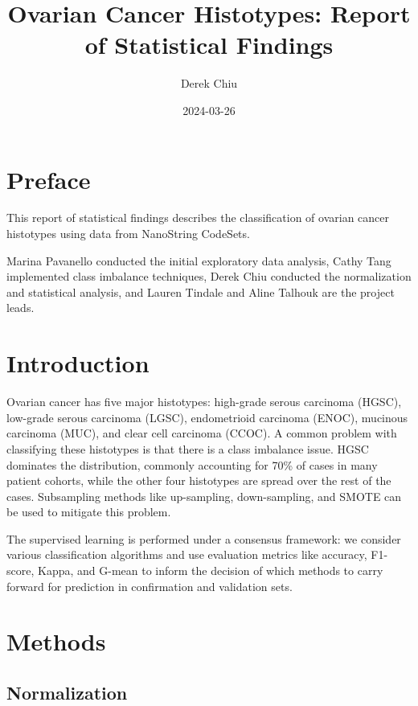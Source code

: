 \documentclass[
]{report}
\title{Ovarian Cancer Histotypes: Report of Statistical Findings}
\author{Derek Chiu}
\date{2024-03-26}
\begin{document}
\maketitle

{
\hypersetup{linkcolor=}
\setcounter{tocdepth}{1}
\tableofcontents
}
\listoffigures
\listoftables
\hypertarget{preface}{%
\chapter*{Preface}\label{preface}}

This report of statistical findings describes the classification of ovarian cancer histotypes using data from NanoString CodeSets.

Marina Pavanello conducted the initial exploratory data analysis, Cathy Tang implemented class imbalance techniques, Derek Chiu conducted the normalization and statistical analysis, and Lauren Tindale and Aline Talhouk are the project leads.

\hypertarget{introduction}{%
\chapter{Introduction}\label{introduction}}

Ovarian cancer has five major histotypes: high-grade serous carcinoma (HGSC), low-grade serous carcinoma (LGSC), endometrioid carcinoma (ENOC), mucinous carcinoma (MUC), and clear cell carcinoma (CCOC). A common problem with classifying these histotypes is that there is a class imbalance issue. HGSC dominates the distribution, commonly accounting for 70\% of cases in many patient cohorts, while the other four histotypes are spread over the rest of the cases. Subsampling methods like up-sampling, down-sampling, and SMOTE can be used to mitigate this problem.

The supervised learning is performed under a consensus framework: we consider various classification algorithms and use evaluation metrics like accuracy, F1-score, Kappa, and G-mean to inform the decision of which methods to carry forward for prediction in confirmation and validation sets.

\hypertarget{methods}{%
\chapter{Methods}\label{methods}}

\hypertarget{normalization}{%
\section{Normalization}\label{normalization}}
\end{document}
